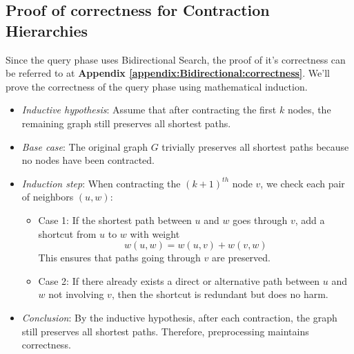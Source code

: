 \begin{appendices}
\section{Proof of correctness for Contraction Hierarchies}\label{appendix:contraction:correctness}
	 Since the query phase uses Bidirectional Search, the proof of it's correctness can be referred to at \textbf{Appendix \ref{appendix:Bidirectional:correctness}}. We'll prove the correctness of the query phase using mathematical induction.
	\begin{itemize}
		\item \textit{Inductive hypothesis}: Assume that after contracting the first \(k\) nodes, the remaining graph still preserves all shortest paths.
		\item \textit{Base case}: The original graph \(G\) trivially preserves all shortest paths because no nodes have been contracted.
		\item \textit{Induction step}: 	When contracting the $(k+1)^{th}$ node \(v\), we check each pair of neighbors \((u, w)\):
		\begin{itemize}
			\item Case 1: If the shortest path between \(u\) and \(w\) goes through \(v\), add a shortcut from \(u\) to \(w\) with weight  
			\[ w(u, w) = w(u, v) + w(v, w) \]
			This ensures that paths going through \(v\) are preserved.
			\item Case 2: If there already exists a direct or alternative path between \(u\) and \(w\) not involving \(v\), then the shortcut is redundant but does no harm.
		\end{itemize}
		\item \textit{Conclusion}: By the inductive hypothesis, after each contraction, the graph still preserves all shortest paths. Therefore, preprocessing maintains correctness.
	\end{itemize}


\end{appendices}
